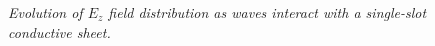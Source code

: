 \documentclass[journal]{IEEEtran}
\begin{document}
\begin{figure}[htbp]
    \centering
    \hfill
    \hfill
    \hfill
    \caption{\small\textit{Evolution of $E_z$ field distribution as waves interact with a single-slot conductive sheet. }}
    \label{fig:single_slot}
\end{figure}
\end{document}
